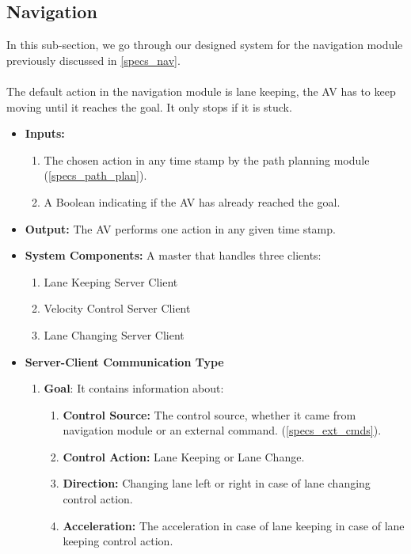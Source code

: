 \subsection{Navigation}
\label{method_nav}
In this sub-section, we go through our designed system for the navigation module previously discussed in \ref{specs_nav}. \\ \\
The default action in the navigation module is lane keeping, the AV has to keep moving until it reaches the goal. It only stops if it is stuck. 
\begin{itemize}
    \item \textbf{Inputs:} 
    \begin{enumerate}
        \item The chosen action in any time stamp by the path planning module (\ref{specs_path_plan}).
        \item A Boolean indicating if the AV has already reached the goal.
    \end{enumerate}
    \item \textbf{Output:} The AV performs one action in any given time stamp. 
    \item \textbf{System Components:} A master that handles three clients:
    \begin{enumerate}
        \item Lane Keeping Server Client
        \item Velocity Control Server Client
        \item Lane Changing Server Client
    \end{enumerate}
    \item \textbf{Server-Client Communication Type}
        \begin{enumerate}
            \item \textbf{Goal}: It contains information about:
                \begin{enumerate}
                \item \textbf{Control Source:} The control source, whether it came from navigation module or an external command. (\ref{specs_ext_cmds}).
                \item \textbf{Control Action:} Lane Keeping or Lane Change.
                \item \textbf{Direction:} Changing lane left or right in case of lane changing control action.
                \item \textbf{Acceleration:} The acceleration in case of lane keeping in case of lane keeping control action.

\end{enumerate}
\end{enumerate}
\end{itemize}
